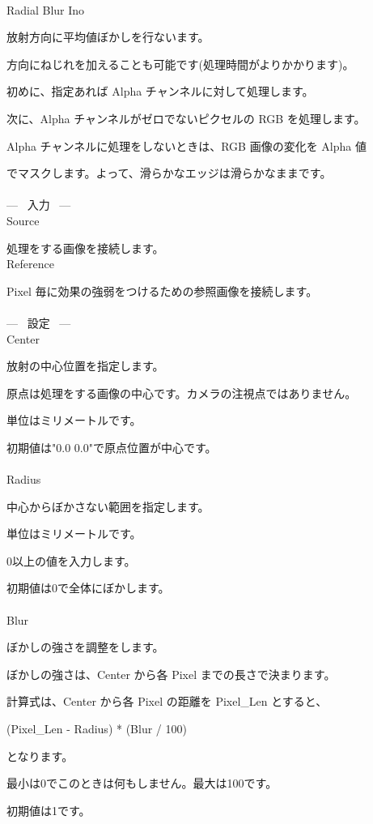 \documentclass[a4paper,12pt]{article}
\begin{document}
\thispagestyle{empty}

\Large
\noindent \\
Radial Blur Ino\medskip
\par
\normalsize
放射方向に平均値ぼかしを行ないます。\par
方向にねじれを加えることも可能です(処理時間がよりかかります)。\\
\par
初めに、指定あれば Alpha チャンネルに対して処理します。\par
次に、Alpha チャンネルがゼロでないピクセルの RGB を処理します。\par
Alpha チャンネルに処理をしないときは、RGB 画像の変化を Alpha 値\par
でマスクします。よって、滑らかなエッジは滑らかなままです。\\
\\
--- \ 入力 \ ---\\
Source\par
処理をする画像を接続します。\\
Reference\par
Pixel 毎に効果の強弱をつけるための参照画像を接続します。\\
\\
--- \ 設定 \ ---\\
Center\par
放射の中心位置を指定します。\par
原点は処理をする画像の中心です。カメラの注視点ではありません。\par
単位はミリメートルです。\par
初期値は"0.0 0.0"で原点位置が中心です。\\
\\
Radius\par
中心からぼかさない範囲を指定します。\par
単位はミリメートルです。\par
0以上の値を入力します。\par
初期値は0で全体にぼかします。\\
\\
Blur\par
ぼかしの強さを調整をします。\par
ぼかしの強さは、Center から各 Pixel までの長さで決まります。\par
計算式は、Center から各 Pixel の距離を Pixel\_Len とすると、\par
(Pixel\_Len - Radius) * (Blur / 100)\par
となります。\par
最小は0でこのときは何もしません。最大は100です。\par
初期値は1です。
\end{document}
